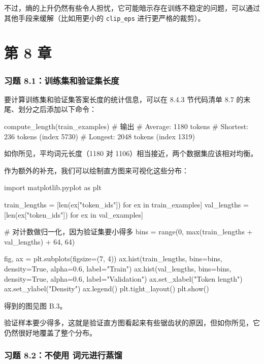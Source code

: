 不过，熵的上升仍然有些令人担忧，它可能暗示存在训练不稳定的问题，可以通过其他手段来缓解（比如用更小的 \texttt{clip\_eps} 进行更严格的裁剪）。

\section{第 8 章}

\subsubsection*{习题 8.1：训练集和验证集长度}

要计算训练集和验证集答案长度的统计信息，可以在 8.4.3 节代码清单 8.7 的末尾、划分之后添加以下命令：

\begin{codebox}
compute_length(train_examples)
# 输出
# Average: 1180 tokens
# Shortest: 236 tokens (index 5730)
# Longest: 2048 tokens (index 1319)
\end{codebox}

如你所见，平均词元长度（1180 对 1106）相当接近，两个数据集应该相对均衡。

作为额外的补充，我们可以绘制直方图来可视化这些分布：

\begin{codebox}
import matplotlib.pyplot as plt

train_lengths = [len(ex["token_ids"]) for ex in train_examples]
val_lengths = [len(ex["token_ids"]) for ex in val_examples]

# 对计数做归一化，因为验证集要小得多
bins = range(0, max(train_lengths + val_lengths) + 64, 64)

fig, ax = plt.subplots(figsize=(7, 4))
ax.hist(train_lengths, bins=bins, density=True, alpha=0.6, label="Train")
ax.hist(val_lengths, bins=bins, density=True, alpha=0.6, label="Validation")
ax.set_xlabel("Token length")
ax.set_ylabel("Density")
ax.legend()
plt.tight_layout()
plt.show()
\end{codebox}

得到的图见图 B.3。


验证样本要少得多，这就是验证直方图看起来有些锯齿状的原因，但如你所见，它仍然很好地覆盖了整个分布。

\subsubsection*{习题 8.2：不使用 词元进行蒸馏}

